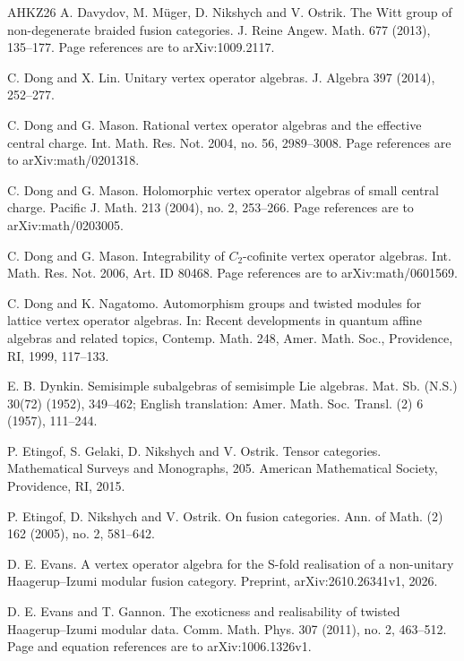 \documentclass[leqno]{article}
\numberwithin{equation}{section}
\begin{document}
\begin{thebibliography}{AHKZ26}
A. Davydov, M. Müger, D. Nikshych and V. Ostrik.
\newblock The Witt group of non-degenerate braided fusion categories.
\newblock J. Reine Angew. Math. 677 (2013), 135--177. Page references are to arXiv:1009.2117.

C. Dong and X. Lin.
\newblock Unitary vertex operator algebras.
\newblock J. Algebra 397 (2014), 252--277.

C. Dong and G. Mason.
\newblock Rational vertex operator algebras and the effective central charge.
\newblock Int. Math. Res. Not. 2004, no. 56, 2989--3008. Page references are to arXiv:math/0201318.

C. Dong and G. Mason.
\newblock Holomorphic vertex operator algebras of small central charge.
\newblock Pacific J. Math. 213 (2004), no. 2, 253--266. Page references are to arXiv:math/0203005.

C. Dong and G. Mason.
\newblock Integrability of $C_2$-cofinite vertex operator algebras.
\newblock Int. Math. Res. Not. 2006, Art. ID 80468. Page references are to arXiv:math/0601569.

C. Dong and K. Nagatomo.
\newblock Automorphism groups and twisted modules for lattice vertex operator algebras.
\newblock In: Recent developments in quantum affine algebras and related topics, Contemp. Math. 248, Amer. Math. Soc., Providence, RI, 1999, 117--133.

E. B. Dynkin.
\newblock Semisimple subalgebras of semisimple Lie algebras.
\newblock Mat. Sb. (N.S.) 30(72) (1952), 349--462; English translation: Amer. Math. Soc. Transl. (2) 6 (1957), 111--244.

P. Etingof, S. Gelaki, D. Nikshych and V. Ostrik.
\newblock Tensor categories.
\newblock Mathematical Surveys and Monographs, 205. American Mathematical Society, Providence, RI, 2015.

P. Etingof, D. Nikshych and V. Ostrik.
\newblock On fusion categories.
\newblock Ann. of Math. (2) 162 (2005), no. 2, 581--642.

D. E. Evans.
\newblock A vertex operator algebra for the S-fold realisation of a non-unitary Haagerup--Izumi modular fusion category.
\newblock Preprint, arXiv:2610.26341v1, 2026.

D. E. Evans and T. Gannon.
\newblock The exoticness and realisability of twisted Haagerup--Izumi modular data.
\newblock Comm. Math. Phys. 307 (2011), no. 2, 463--512. Page and equation references are to arXiv:1006.1326v1.


\end{thebibliography}
\end{document}

